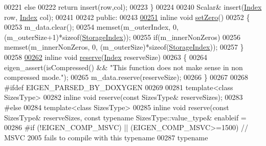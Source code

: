 \begin{DoxyCode}
00221       \textcolor{keywordflow}{else}
00222         \textcolor{keywordflow}{return} insert(row,col);
00223     \}
00224 
00240     Scalar& insert(\hyperlink{group___core___module_a554f30542cc2316add4b1ea0a492ff02}{Index} row, \hyperlink{group___core___module_a554f30542cc2316add4b1ea0a492ff02}{Index} col);
00241 
00242   \textcolor{keyword}{public}:
00243 
\hyperlink{group___sparse_core___module_ad3c7416090f913e8685523cb3ab7c2f7}{00251}     \textcolor{keyword}{inline} \textcolor{keywordtype}{void} \hyperlink{group___sparse_core___module_ad3c7416090f913e8685523cb3ab7c2f7}{setZero}()
00252     \{
00253       m\_data.clear();
00254       memset(m\_outerIndex, 0, (m\_outerSize+1)*\textcolor{keyword}{sizeof}(\hyperlink{group___sparse_core___module_a0b540ba724726ebe953f8c0df06081ed}{StorageIndex}));
00255       \textcolor{keywordflow}{if}(m\_innerNonZeros)
00256         memset(m\_innerNonZeros, 0, (m\_outerSize)*\textcolor{keyword}{sizeof}(\hyperlink{group___sparse_core___module_a0b540ba724726ebe953f8c0df06081ed}{StorageIndex}));
00257     \}
00258 
\hyperlink{group___sparse_core___module_a1518e58ac49bed0e2385b722a034f7d3}{00262}     \textcolor{keyword}{inline} \textcolor{keywordtype}{void} \hyperlink{group___sparse_core___module_a1518e58ac49bed0e2385b722a034f7d3}{reserve}(\hyperlink{group___core___module_a554f30542cc2316add4b1ea0a492ff02}{Index} reserveSize)
00263     \{
00264       eigen\_assert(isCompressed() && \textcolor{stringliteral}{"This function does not make sense in non compressed mode."});
00265       m\_data.reserve(reserveSize);
00266     \}
00267     
00268 \textcolor{preprocessor}{    #ifdef EIGEN\_PARSED\_BY\_DOXYGEN}
00269 
00281     \textcolor{keyword}{template}<\textcolor{keyword}{class} SizesType>
00282     \textcolor{keyword}{inline} \textcolor{keywordtype}{void} reserve(\textcolor{keyword}{const} SizesType& reserveSizes);
00283 \textcolor{preprocessor}{    #else}
00284     \textcolor{keyword}{template}<\textcolor{keyword}{class} SizesType>
00285     \textcolor{keyword}{inline} \textcolor{keywordtype}{void} reserve(\textcolor{keyword}{const} SizesType& reserveSizes, \textcolor{keyword}{const} \textcolor{keyword}{typename} SizesType::value\_type& enableif =
00286     #\textcolor{keywordflow}{if} (!EIGEN\_COMP\_MSVC) || (EIGEN\_COMP\_MSVC>=1500) \textcolor{comment}{// MSVC 2005 fails to compile with this typename}
00287         \textcolor{keyword}{typename}

\end{DoxyCode}
